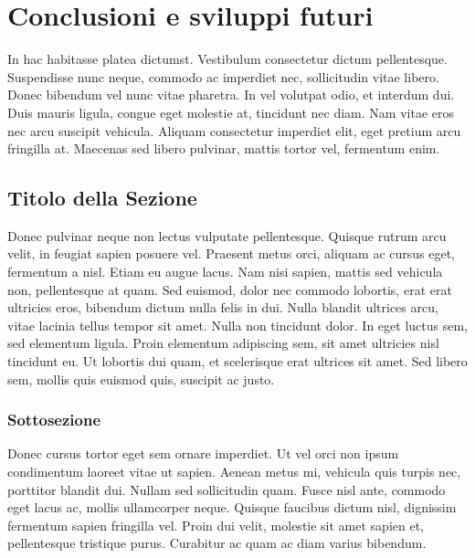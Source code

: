 \documentclass[target=mst,aauheader=,style=]{thud}
\begin{document}
\chapter{Conclusioni e sviluppi futuri}
In hac habitasse platea dictumst. Vestibulum consectetur dictum pellentesque. Suspendisse nunc neque, commodo ac imperdiet nec, sollicitudin vitae libero. Donec bibendum vel nunc vitae pharetra. In vel volutpat odio, et interdum dui. Duis mauris ligula, congue eget molestie at, tincidunt nec diam. Nam vitae eros nec arcu suscipit vehicula. Aliquam consectetur imperdiet elit, eget pretium arcu fringilla at. Maecenas sed libero pulvinar, mattis tortor vel, fermentum enim.

\section{Titolo della Sezione}
Donec pulvinar neque non lectus vulputate pellentesque. Quisque rutrum arcu velit, in feugiat sapien posuere vel. Praesent metus orci, aliquam ac cursus eget, fermentum a nisl. Etiam eu augue lacus. Nam nisi sapien, mattis sed vehicula non, pellentesque at quam. Sed euismod, dolor nec commodo lobortis, erat erat ultricies eros, bibendum dictum nulla felis in dui. Nulla blandit ultrices arcu, vitae lacinia tellus tempor sit amet. Nulla non tincidunt dolor. In eget luctus sem, sed elementum ligula. Proin elementum adipiscing sem, sit amet ultricies nisl tincidunt eu. Ut lobortis dui quam, et scelerisque erat ultrices sit amet. Sed libero sem, mollis quis euismod quis, suscipit ac justo.

\subsection{Sottosezione}
Donec cursus tortor eget sem ornare imperdiet. Ut vel orci non ipsum condimentum laoreet vitae ut sapien. Aenean metus mi, vehicula quis turpis nec, porttitor blandit dui. Nullam sed sollicitudin quam. Fusce nisl ante, commodo eget lacus ac, mollis ullamcorper neque. Quisque faucibus dictum nisl, dignissim fermentum sapien fringilla vel. Proin dui velit, molestie sit amet sapien et, pellentesque tristique purus. Curabitur ac quam ac diam varius bibendum.


\appendix

\end{document}
